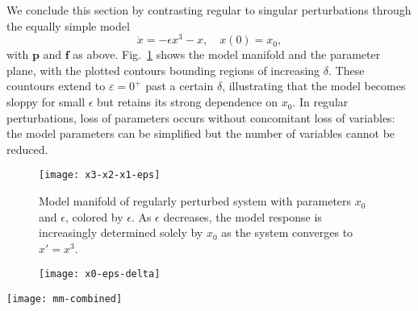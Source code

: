 We conclude this section by contrasting regular to singular
perturbations through the equally simple model
% 
\begin{equation}
  \dot{x} = -\epsilon x^3 - x,
  \quad
  x(0) = x_0 ,
  \label{1D-model-regpert}
\end{equation}
% 
with $\mathbf{p}$ and $\mathbf{f}$ as above.  Fig.~\ref{fig:reg-pert}
shows the model manifold and the parameter plane, with the plotted
contours bounding regions of increasing $\delta$.  These countours
extend to $\varepsilon = 0^+$ past a certain $\delta$, illustrating
that the model becomes sloppy for small $\epsilon$ but retains its strong
dependence on $x_0$.  In regular perturbations, loss of parameters
occurs without concomitant loss of variables: the model parameters can
be simplified but the number of variables cannot be reduced.

\begin{figure*}
  \centering
  \begin{subfigure}[t]{0.45\linewidth}
    \centering
    \texttt{[image: x3-x2-x1-eps]}
    \caption{Model manifold of regularly perturbed system with
      parameters $x_0$ and $\epsilon$, colored by $\epsilon$. As
      $\epsilon$ decreases, the model response is increasingly
      determined solely by $x_0$ as the system converges to
      $x' = x^3$. \label{fig:reg-pert} }
  \end{subfigure}
  \hspace{0.5cm}
  \begin{subfigure}[t]{0.45\linewidth}
    \centering
    \texttt{[image: x0-eps-delta]}
  \end{subfigure}
  \caption[Model manifold and parameter space of the regularly
  perturbed system]{Model manifold and parameter space of the
    regularly perturbed system \eqref{1D-model-regpert} with select
    $\delta$ contours \label{fig:reg-pert} }
\end{figure*}

\begin{figure*}[ht!]
  \centering
  \texttt{[image: mm-combined]}
  \caption[Quantitative illustration of mapping from parameter space
  to the model manifold]{Correspondence between parameter space (left)
    and the model manifold (right). At large values of $\epsilon$,
    rectangles in parameter space are mapped to skewed rectangles on
    the model manifold. At intermediate values of $\epsilon$, they are
    stretched into nearly one-dimensional segments. At small values
    where the system is singularly perturbed, patches in parameter
    space map to approximately the same point on the model manifold,
    the hallmark of sloppiness.}
\end{figure*}

